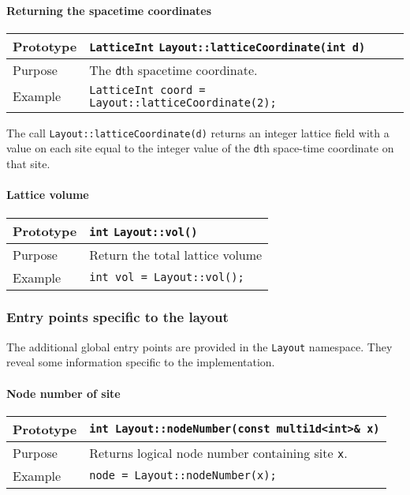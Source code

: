 \documentclass[12pt,letterpaper]{article}
\newcommand{\tLatticeInt}{LatticeInt}
\begin{document}
\paragraph{Returning the spacetime coordinates}

\begin{flushleft}
  \begin{tabular}{|l|l|}
  \hline
  Prototype      & {\tt \tLatticeInt} \verb|Layout::latticeCoordinate(int d)|\\
  \hline
  Purpose        & The {\tt d}th spacetime coordinate. \\
  \hline
  Example        & {\tt \tLatticeInt{} coord = Layout::latticeCoordinate(2);} \\
  \hline
 \end{tabular}
\end{flushleft}
%
The call \verb|Layout::latticeCoordinate(d)| returns an integer lattice field with a
value on each site equal to the integer value of the \verb|d|th
space-time coordinate on that site.

\paragraph{Lattice volume}

\begin{flushleft}
  \begin{tabular}{|l|l|}
  \hline
  Prototype      & {\tt int} \verb|Layout::vol()|\\
  \hline
  Purpose        & Return the total lattice volume\\
  \hline
  Example        & {\tt int vol = Layout::vol();} \\
  \hline
 \end{tabular}
\end{flushleft}

\subsubsection{Entry points specific to the layout}
        
The additional global entry points are provided in the \verb|Layout| namespace.
They reveal some information specific to the implementation.

\paragraph{Node number of site}

\begin{flushleft}
  \begin{tabular}{|l|l|}
  \hline
  Prototype      & \verb|int Layout::nodeNumber(const multi1d<int>& x)|\\
    \hline
  Purpose        & Returns logical node number containing site \verb|x|. \\
\hline
  Example  & \verb|node = Layout::nodeNumber(x);| \\
   \hline
 \end{tabular}
\end{flushleft}
\end{document}
